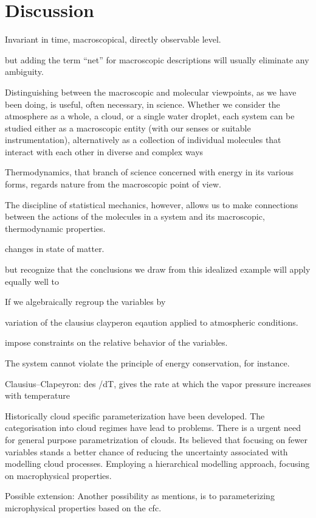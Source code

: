 \chapter{Discussion}
Invariant in time, 
macroscopical, directly observable level.

but adding the term “net” for macroscopic descriptions will usually
eliminate any ambiguity.

Distinguishing between the macroscopic and molecular viewpoints, as we have been
doing, is useful, often necessary, in science. Whether we consider the atmosphere as a
whole, a cloud, or a single water droplet, each system can be studied either as a macroscopic
entity (with our senses or suitable instrumentation), alternatively as a collection of
individual molecules that interact with each other in diverse and complex ways

Thermodynamics, that branch of science concerned with energy in its various forms,
regards nature from the macroscopic point of view.

The discipline of statistical mechanics, however, allows us to make connections
between the actions of the molecules in a system and its macroscopic, thermodynamic
properties.

changes in state of matter.

but recognize that the
conclusions we draw from this idealized example will apply equally well to


If we algebraically regroup the variables by

variation of the clausius clayperon eqaution applied to atmospheric conditions.

impose constraints on the relative behavior of the variables.

The system cannot violate the principle of energy conservation, for instance.

Clausius–Clapeyron: des /dT, gives the rate at which the vapor pressure increases with temperature

Historically cloud specific parameterization have been developed. The categorisation into cloud regimes have lead to problems. There is a urgent need for general purpose parametrization of clouds. Its believed that focusing on fewer variables stands a better chance of reducing the uncertainty associated with modelling cloud processes. Employing a hierarchical modelling approach, focusing on macrophysical properties.

Possible extension: Another possibility as \cite{Fowler1996LiquidAssumptions} mentions, is to parameterizing microphysical properties based on the \acrshort{cfc}.

